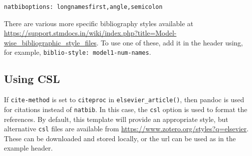 \documentclass[
  super,
  preprint,
  3p]{elsarticle}
\begin{document}
\begin{verbatim}
natbiboptions: longnamesfirst,angle,semicolon
\end{verbatim}

There are various more specific bibliography styles available at
\url{https://support.stmdocs.in/wiki/index.php?title=Model-wise_bibliographic_style_files}.
To use one of these, add it in the header using, for example,
\texttt{biblio-style:\ model1-num-names}.

\hypertarget{using-csl}{%
\subsection{Using CSL}\label{using-csl}}

If \texttt{cite-method} is set to \texttt{citeproc} in
\texttt{elsevier\_article()}, then pandoc is used for citations instead
of \texttt{natbib}. In this case, the \texttt{csl} option is used to
format the references. By default, this template will provide an
appropriate style, but alternative \texttt{csl} files are available from
\url{https://www.zotero.org/styles?q=elsevier}. These can be downloaded
and stored locally, or the url can be used as in the example header.


\renewcommand\refname{References}
  
\end{document}
